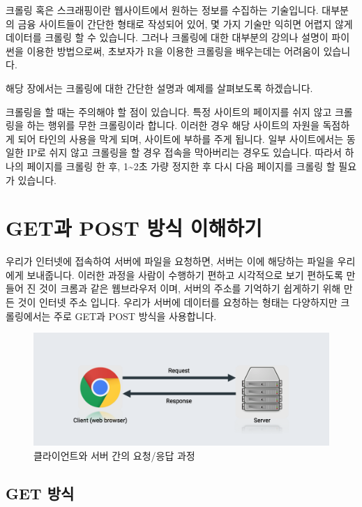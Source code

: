 \documentclass[]{book}
\begin{document}
크롤링 혹은 스크래핑이란 웹사이트에서 원하는 정보를 수집하는 기술입니다. 대부분의 금융 사이트들이 간단한 형태로 작성되어 있어, 몇 가지 기술만 익히면 어렵지 않게 데이터를 크롤링 할 수 있습니다. 그러나 크롤링에 대한 대부분의 강의나 설명이 파이썬을 이용한 방법으로써, 초보자가 R을 이용한 크롤링을 배우는데는 어려움이 있습니다.

해당 장에서는 크롤링에 대한 간단한 설명과 예제를 살펴보도록 하겠습니다.

크롤링을 할 때는 주의해야 할 점이 있습니다. 특정 사이트의 페이지를 쉬지 않고 크롤링을 하는 행위를 무한 크롤링이라 합니다. 이러한 경우 해당 사이트의 자원을 독점하게 되어 타인의 사용을 막게 되며, 사이트에 부하를 주게 됩니다. 일부 사이트에서는 동일한 IP로 쉬지 않고 크롤링을 할 경우 접속을 막아버리는 경우도 있습니다. 따라서 하나의 페이지를 크롤링 한 후, 1\textasciitilde{}2초 가량 정지한 후 다시 다음 페이지를 크롤링 할 필요가 있습니다.

\hypertarget{get-post--}{%
\section{GET과 POST 방식 이해하기}\label{get-post--}}

우리가 인터넷에 접속하여 서버에 파일을 요청하면, 서버는 이에 해당하는 파일을 우리에게 보내줍니다. 이러한 과정을 사람이 수행하기 편하고 시각적으로 보기 편하도록 만들어 진 것이 크롬과 같은 웹브라우저 이며, 서버의 주소를 기억하기 쉽게하기 위해 만든 것이 인터넷 주소 입니다. 우리가 서버에 데이터를 요청하는 형태는 다양하지만 크롤링에서는 주로 GET과 POST 방식을 사용합니다.

\begin{figure}

{\centering \includegraphics{images/crawl_flow} 

}

\caption{클라이언트와 서버 간의 요청/응답 과정}\label{fig:unnamed-chunk-1}
\end{figure}

\hypertarget{get-}{%
\subsection{GET 방식}\label{get-}}
\end{document}
